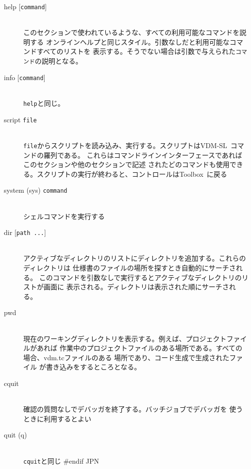 \documentclass[\pformat,12pt]{article}
\newcommand{\vdmslpp}{VDM-SL}
\newcommand{\Toolbox}{Toolbox}
\newcommand{\vdmslpp}{VDM++}
\newcommand{\Toolbox}{Toolbox}
\begin{document}
\begin{description}
\item[help \mbox{[{\tt command}]}] \mbox{}\\
  このセクションで使われているような、すべての利用可能なコマンドを説明する
  オンラインヘルプと同じスタイル。引数なしだと利用可能なコマンドすべてのリストを
  表示する。そうでない場合は引数で与えられた{\tt コマンド}の説明となる。

\item[info \mbox{[{\tt command}]}] \mbox{}\\
  {\tt help}と同じ。

\item[script {\tt file}] \mbox{}\\
  {\tt file}からスクリプトを読み込み、実行する。スクリプトは\vdmslpp\ コマンドの羅列である。
  これらはコマンドラインインターフェースであればこのセクションや他のセクションで記述
  されたどのコマンドも使用できる。スクリプトの実行が終わると、コントロールは\Toolbox\ に戻る

\item[system (sys) {\tt command}]\mbox{}\\
  シェルコマンドを実行する

\item[dir \mbox{[{\tt path ...}]}] \mbox{}\\
  アクティブなディレクトリのリストにディレクトリを追加する。これらのディレクトリは
  仕様書のファイルの場所を探すとき自動的にサーチされる。
  このコマンドを引数なしで実行するとアクティブなディレクトリのリストが画面に
  表示される。ディレクトリは表示された順にサーチされる。

\item[pwd]  \mbox{}\\
  現在のワーキングディレクトリを表示する。例えば、プロジェクトファイルがあれば
  作業中のプロジェクトファイルのある場所である。すべての場合、vdm.tcファイルのある
  場所であり、コード生成で生成されたファイル 
  が書き込みをするところとなる。

\item[cquit]  \mbox{}\\
  確認の質問なしでデバッガを終了する。バッチジョブでデバッガを
  使うときに利用するとよい

\item[quit (q)] \mbox{}\\
  {\tt cquit}と同じ
#endif JPN

\end{description}
\end{document}
